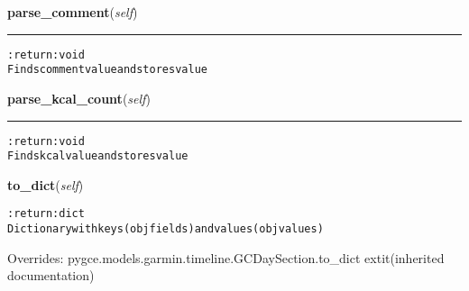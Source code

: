     \vspace{0.5ex}

\hspace{.8\funcindent}\begin{boxedminipage}{\funcwidth}

    \raggedright \textbf{parse\_comment}(\textit{self})

    \vspace{-1.5ex}

    \rule{\textwidth}{0.5\fboxrule}
\setlength{\parskip}{2ex}
\begin{alltt}

:return: void
    Finds comment value and stores value
\end{alltt}

\setlength{\parskip}{1ex}
    \end{boxedminipage}

    \label{pygce:models:garmin:timeline:GCDaySummary:parse_kcal_count}

    \vspace{0.5ex}

\hspace{.8\funcindent}\begin{boxedminipage}{\funcwidth}

    \raggedright \textbf{parse\_kcal\_count}(\textit{self})

    \vspace{-1.5ex}

    \rule{\textwidth}{0.5\fboxrule}
\setlength{\parskip}{2ex}
\begin{alltt}

:return: void
    Finds kcal value and stores value
\end{alltt}

\setlength{\parskip}{1ex}
    \end{boxedminipage}

    \vspace{0.5ex}

\hspace{.8\funcindent}\begin{boxedminipage}{\funcwidth}

    \raggedright \textbf{to\_dict}(\textit{self})

\setlength{\parskip}{2ex}
\begin{alltt}

:return: dict
    Dictionary with keys (obj fields) and values (obj values)
\end{alltt}

\setlength{\parskip}{1ex}
      Overrides: pygce.models.garmin.timeline.GCDaySection.to\_dict 	extit{(inherited documentation)}

    \end{boxedminipage}


